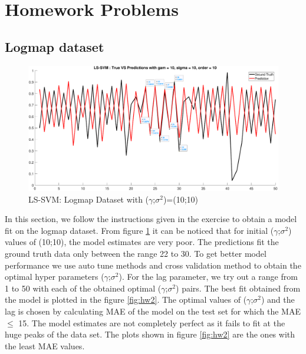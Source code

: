 \section{Homework Problems}
\subsection{Logmap dataset}

\begin{figure}
	\begin{center}
		\includegraphics[height=0.5\linewidth,width= 1\linewidth]{Exercise2/Report/HWOriginal.eps} 
		\caption{LS-SVM: Logmap Dataset with ($\gamma$;$\sigma^2$)=(10;10)}
		\label{fig:hw1}
	\end{center}
\end{figure}
In this section, we follow the instructions given in the exercise to obtain a model fit on the logmap dataset. From figure \ref{fig:hw1} it can be noticed that for initial ($\gamma$;$\sigma^2$) values of (10;10), the model estimates are very poor. The predictions fit the ground truth data only between the range 22 to 30. To get better model performance we use auto tune methods and cross validation method to obtain the optimal hyper parameters ($\gamma$;$\sigma^2$). For the lag parameter, we try out a range from 1 to 50 with each of the obtained optimal ($\gamma$;$\sigma^2$) pairs. The best fit obtained from the model is plotted in the figure \ref{fig:hw2}. The optimal values of ($\gamma$;$\sigma^2$) and the lag is chosen by calculating MAE of the model on the test set for which the MAE $\leq$ 15. The model estimates are not completely perfect as it fails to fit at the huge peaks of the data set. The plots shown in figure \ref{fig:hw2} are the ones with the least MAE values.
